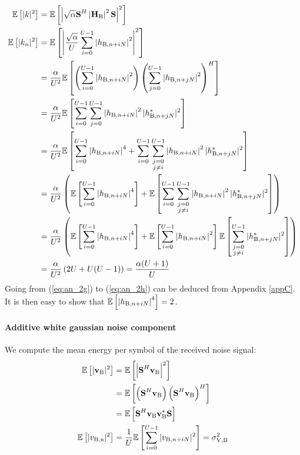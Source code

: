 \begin{subequations}
    \begin{align}
        \mathbb{E} \left[|k|^2\right] &= \mathbb{E} \left[\left|\sqrt{\alpha}\textbf{S}^H \left|\textbf{H}_{\text{B}}\right|^2 \textbf{S}\right|^2\right] \\
        \mathbb{E} \left[|k_n|^2\right] &=\mathbb{E} \left[\left|\frac{\sqrt{\alpha}}{U}\sum_{i=0}^{U-1} \left| h_{\text{B}, n + iN}\right|^2\right|^2\right]  \\
        &= \frac{\alpha}{U^2} \mathbb{E} \left[\left(\sum_{i=0}^{U-1} \left| h_{\text{B}, n + iN}\right|^2\right) \left(\sum_{j=0}^{U-1} \left| h_{\text{B}, n + jN}\right|^2\right)^H\right] \label{subeq:appA:comp1}\\
        &= \frac{\alpha}{U^2}\mathbb{E} \left[\sum_{i=0}^{U-1}\sum_{j=0}^{U-1}\left| h_{\text{B}, n + iN}\right|^2 | h^*_{\text{B}, n + jN}|^2\right] \\
        &= \frac{\alpha}{U^2}\mathbb{E} \left[\sum_{i=0}^{U-1}\left| h_{\text{B}, n + iN}\right|^4 + \sum_{i=0}^{U-1}\sum_{\substack{j=0 \\ j\neq i}}^{U-1}\left| h_{\text{B}, n + iN}\right|^2 | h^*_{\text{B}, n + jN}|^2\right] \\
        &= \frac{\alpha}{U^2} \left(\mathbb{E} \left[\sum_{i=0}^{U-1}\left| h_{\text{B}, n + iN}\right|^4\right] + \mathbb{E} \left[\sum_{i=0}^{U-1}\sum_{\substack{j=0 \\ j\neq i}}^{U-1}\left| h_{\text{B}, n + iN}\right|^2 | h^*_{\text{B}, n + jN}|^2\right] \right) \\
        &=  \frac{\alpha}{U^2} \left(\mathbb{E} \left[\sum_{i=0}^{U-1}\left| h_{\text{B}, n + iN}\right|^4\right] + \mathbb{E} \left[\sum_{i=0}^{U-1}\left| h_{\text{B}, n + iN}\right|^2\right]\mathbb{E} \left[\sum_{\substack{j=0 \\ j\neq i}}^{U-1} | h^*_{\text{B}, n + jN}|^2\right] \right) \label{eq:an_2g}\\
        &= \frac{\alpha}{U^2} \left( 2U + U(U-1)\right) = \frac{\alpha (U+1)}{U} \label{eq:an_2h}
    \end{align}
    \label{eq:appA:data_bob}
\end{subequations}
Going from (\ref{eq:an_2g}) to (\ref{eq:an_2h}) can be deduced from Appendix \ref{appC}. It is then easy to show that $\mathbb{E} \left[\left| h_{\text{B}, n + iN}\right|^4\right]=2$. 

\paragraph*{Additive white gaussian noise component}
We compute the mean energy per symbol of the received noise signal:
\begin{subequations}
    \begin{align}
        \mathbb{E} \left[|\textbf{v}_{\text{B}}|^2\right] &=  \mathbb{E} \left[\left|\textbf{S}^H \textbf{v}_{\text{B}}\right|^2\right] \\
        &= \mathbb{E} \left[\left(\textbf{S}^H \textbf{v}_{\text{B}} \right)\left(\textbf{S}^H \textbf{v}_{\text{B}} \right)^H\right] \\
        &=\mathbb{E} \left[\textbf{S}^H \textbf{v}_{\text{B}} \textbf{v}_{\text{B}}^* \textbf{S} \right] \\
        \mathbb{E} \left[|v_{\text{B,n}}|^2\right] &= \frac{1}{U} \mathbb{E} \left[\sum_{i=0}^{U-1} |v_{\text{B}, n + iN}|^2\right] = \sigma^2_{\text{V,B}}
    \end{align}
    \label{eq:appA:noise_bob}
\end{subequations}

